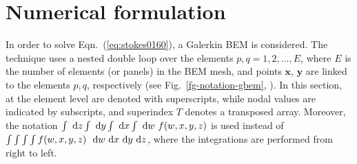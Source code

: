 \documentclass[oneside,onecolumn,10pt,final]{asme2ej}
\newcounter{tema}
\begin{document}

\section{Numerical formulation}
\label{sec:nume-formulation}

\noindent
In order to solve Eqn.~(\ref{eq:stokes0160}), a Galerkin 
BEM is considered. The technique uses a nested double loop over 
the elements $p,q=1,2,...,E$, where $E$ is the number of elements 
(or panels) in the BEM mesh, and points $\bm {x}$, $\bm {y}$ are 
linked to the elements $p,q$, respectively (see 
Fig.~\ref{fg-notation-gbem}, ).
%
In this section,  at the element
level are denoted with superscripts, while nodal values are indicated
by subscripts, and superindex $T$ denotes a transposed array. 
Moreover, the notation
$\int {~\mathrm{d}} z \int {~\mathrm{d}} y \int {~\mathrm{d}} x \int {~\mathrm{d}} w ~ f (w,x,y,z)$
is used instead of
$\int \int \int \int f (w,x,y,z) ~ {~\mathrm{d}} w {~\mathrm{d}} x {~\mathrm{d}} y {~\mathrm{d}} z$, 
where the integrations are performed from right to left.
\end{document}
